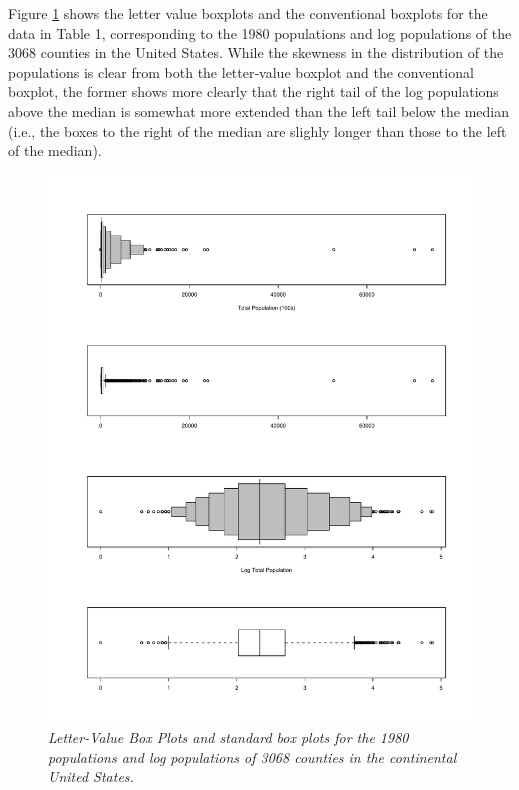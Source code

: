 \documentclass[11pt]{article}
\begin{document}
Figure \ref{lvpops} shows the letter value boxplots
and the conventional boxplots for the data in Table 1,
corresponding to the 1980 populations and log populations
of the 3068 counties in the United States.  While the
skewness in the distribution of the populations is
clear from both the letter-value boxplot and the
conventional boxplot, the former shows more clearly
that the right tail of the log populations above the 
median is somewhat more extended than the left tail
below the median (i.e., the boxes to the right of
the median are slighly longer than those to the
left of the median).


\begin{figure}[hbt]
\begin{center}
\includegraphics[width=6in]{lvplot.pdf}
\caption{\it \label{lvpops} Letter-Value Box Plots and standard 
box plots for the 1980 populations and log populations of 3068
counties in the continental United States.}
\end{center}
\end{figure}
\end{document}
